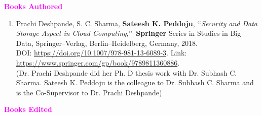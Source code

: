 \begin{flushleft}
	\textbf{\textcolor{magenta}{Books Authored}} 
\end{flushleft}


\begin{enumerate}%
\item%
Prachi Deshpande, S. C. Sharma, \textbf{Sateesh K. Peddoju},
\lq\lq \emph{Security and Data Storage Aspect in Cloud Computing},\rq\rq\, \textbf{Springer} Series in
Studies in Big Data, Springer--Verlag, Berlin--Heidelberg,
Germany, 2018. \\DOI: \url{https://doi.org/10.1007/978-981-13-6089-3}. Link: \url{https://www.springer.com/gp/book/9789811360886}.
\\(Dr. Prachi Deshpande did her Ph. D thesis work with Dr. Subhash C. Sharma. Sateesh K. Peddoju is the colleague to Dr. Subhash C. Sharma and is the Co-Supervisor to Dr. Prachi Deshpande)
\end{enumerate}

\begin{flushleft}
	\textbf{\textcolor{magenta}{Books Edited}} 
\end{flushleft}

